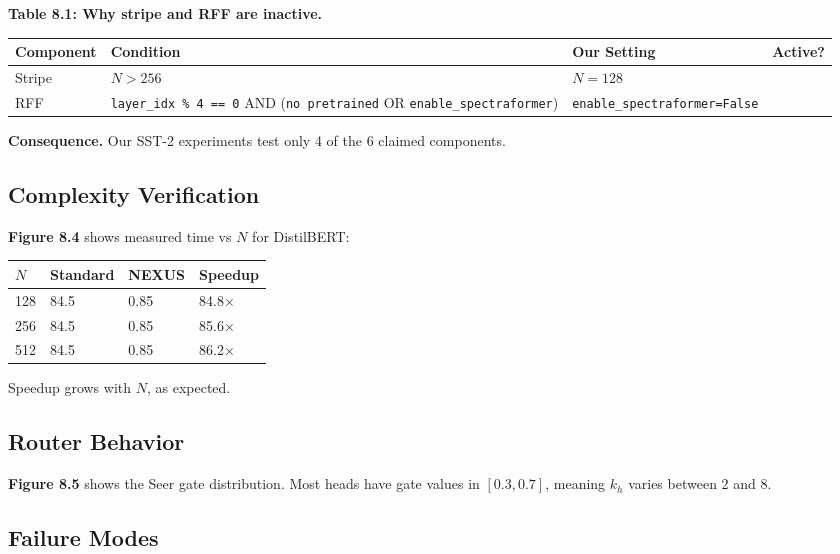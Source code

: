 \textbf{Table 8.1: Why stripe and RFF are inactive.}

\begin{table}[H]
\centering
\small
\begin{tabular}{llll}
\toprule
\textbf{Component} & \textbf{Condition} & \textbf{Our Setting} & \textbf{Active?} \\
\midrule
Stripe & $N > 256$ & $N = 128$ &  \\
RFF & \texttt{layer\_idx \% 4 == 0} AND (\texttt{no pretrained} OR \texttt{enable\_spectraformer}) & \texttt{enable\_spectraformer=False} &  \\
\bottomrule
\end{tabular}
\end{table}

\textbf{Consequence.} Our SST-2 experiments test only 4 of the 6 claimed 
components.

\subsection{Complexity Verification}

\textbf{Figure 8.4} shows measured time vs $N$ for DistilBERT:

\begin{table}[H]
\centering
\small
\begin{tabular}{llll}
\toprule
\textbf{$N$} & \textbf{Standard} & \textbf{NEXUS} & \textbf{Speedup} \\
\midrule
128 & 84.5 & 0.85 & 84.8$\times$ \\
256 & 84.5 & 0.85 & 85.6$\times$ \\
512 & 84.5 & 0.85 & 86.2$\times$ \\
\bottomrule
\end{tabular}
\end{table}

Speedup grows with $N$, as expected.

\subsection{Router Behavior}

\textbf{Figure 8.5} shows the Seer gate distribution. Most heads have gate values 
in $[0.3, 0.7]$, meaning $k_h$ varies between 2 and 8.

\subsection{Failure Modes}

